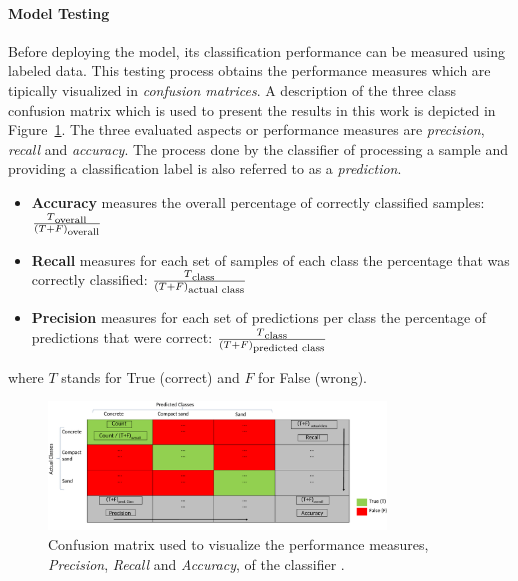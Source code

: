 

\paragraph*{Model Testing}
Before deploying the model, its classification performance can be measured using labeled data.
This testing process obtains the performance measures which are tipically visualized in \emph{confusion matrices}. 
A description of the three class confusion matrix which is used to present the results in this work is depicted in Figure~\ref{fig:CMdescrpit}.
The three evaluated aspects or performance measures are \emph{precision}, \emph{recall} and \emph{accuracy}.
The process done by the classifier of processing a sample and providing a classification label is also referred to as a \emph{prediction}.

\begin{itemize}
\item \textbf{Accuracy} measures the overall percentage of correctly classified samples: $\frac{T\textsubscript{overall}}{(T+F)\textsubscript{overall}}$ 
\item \textbf{Recall} measures for each set of samples of each class the percentage that was correctly classified: $\frac{T\textsubscript{class}}{(T+F)\textsubscript{actual class}}$%
\item \textbf{Precision} measures for each set of predictions per class the percentage of predictions that were correct: $\frac{T\textsubscript{class}}{(T+F)\textsubscript{predicted class}}$%
\end{itemize}
where $T$ stands for True (correct) and $F$ for False (wrong).

\begin{figure}[!htbp]
    \centering
    \includegraphics[width=0.8\textwidth]{../figures/CM_Description.pdf}
    \caption{\label{fig:CMdescrpit} Confusion matrix used to visualize the performance measures, \emph{Precision}, \emph{Recall} and \emph{Accuracy}, of the classifier \cite{kuhr2021}.}
\end{figure}



